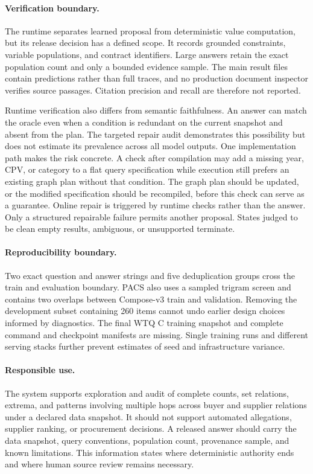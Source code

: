 \paragraph{Verification boundary.}
The runtime separates learned proposal from deterministic value computation, but its release
decision has a defined scope.  It records grounded constraints, variable populations, and contract
identifiers.  Large answers retain the exact population count and only a bounded evidence sample.  The main result
files contain predictions rather than full traces, and no production document inspector verifies
source passages.  Citation precision and recall are therefore not reported.

Runtime verification also differs from semantic faithfulness.  An answer can match the oracle even
when a condition is redundant on the current snapshot and absent from the plan.  The targeted
repair audit demonstrates this possibility but does not estimate its prevalence across all model
outputs.  One implementation path makes the risk concrete.  A check after compilation may add a missing
year, CPV, or category to a flat query specification while execution still prefers an existing
graph plan without that condition.  The graph plan should be updated, or the modified specification
should be recompiled, before this check can serve as a guarantee.  Online repair is triggered by
runtime checks rather than the answer.  Only a structured repairable failure permits another
proposal.  States judged to be clean empty results, ambiguous, or unsupported terminate.

\paragraph{Reproducibility boundary.}
Two exact question and answer strings and five deduplication groups cross the train and evaluation
boundary.  PACS also uses a sampled trigram screen and contains two overlaps between Compose-v3
train and validation.  Removing the development subset containing 260 items cannot undo earlier
design choices informed by diagnostics.  The final WTQ C training snapshot and complete command and
checkpoint manifests are missing.  Single training runs and different serving stacks further
prevent estimates of seed and infrastructure variance.

\paragraph{Responsible use.}
The system supports exploration and audit of complete counts, set relations, extrema, and patterns
involving multiple hops across buyer and supplier relations under a declared data snapshot.  It
should not support automated allegations, supplier ranking, or procurement decisions.  A released answer should carry the data
snapshot, query conventions, population count, provenance sample, and known limitations.  This
information states where deterministic authority ends and where human source review remains
necessary.
